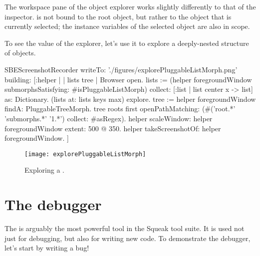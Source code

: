 \documentclass[a4paper,10pt,twoside]{book}
\begin{document}
The workspace pane of the object explorer works slightly differently to that of the inspector.
 is not bound to the root object, but rather to the object that is currently selected; the instance variables of the selected object are also in scope.

To see the value of the explorer, let's use it to explore a deeply-nested structure of objects.


\begin{ExecuteSmalltalkScript}
SBEScreenshotRecorder writeTo: './figures/explorePluggableListMorph.png' building: [:helper |
	| lists tree |
	Browser open.
	lists := (helper foregroundWindow submorphsSatisfying: #isPluggableListMorph)
		collect: [:list | list center x -> list] as: Dictionary.
	(lists at: lists keys max) explore.
	tree := helper foregroundWindow findA: PluggableTreeMorph.
	tree roots first openPathMatching: (#('root.*' 'submorphs.*' '1.*') collect: #asRegex).
	helper scaleWindow: helper foregroundWindow extent: 500 @ 350.
	helper takeScreenshotOf: helper foregroundWindow.
]
\end{ExecuteSmalltalkScript}
\begin{figure}[tbp]
	\begin{center}
		\texttt{[image: explorePluggableListMorph]}
	\end{center}
	\caption{Exploring a .}
	\label{fig:explorePluggableListMorph}
\end{figure}

\section{The debugger}
\label{sec:debugger} %

The  is arguably the most powerful tool in the Squeak tool suite.
It is used not just for debugging, but also for writing new code.
To demonstrate the debugger, let's start by writing a bug!
\end{document}
